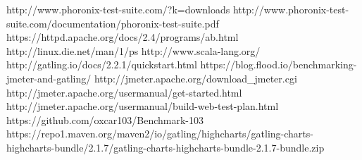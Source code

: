 \newpage

\begin{thebibliography}{xx}
	 http://www.phoronix-test-suite.com/?k=downloads
	 http://www.phoronix-test-suite.com/documentation/phoronix-test-suite.pdf
	 https://httpd.apache.org/docs/2.4/programs/ab.html
	 http://linux.die.net/man/1/ps
	 http://www.scala-lang.org/
	 http://gatling.io/docs/2.2.1/quickstart.html
	 https://blog.flood.io/benchmarking-jmeter-and-gatling/
	 http://jmeter.apache.org/download\_jmeter.cgi
	 http://jmeter.apache.org/usermanual/get-started.html
	 http://jmeter.apache.org/usermanual/build-web-test-plan.html
	 https://github.com/oxcar103/Benchmark-103
	https://repo1.maven.org/maven2/io/gatling/highcharts/gatling-charts-highcharts-bundle/2.1.7/gatling-charts-highcharts-bundle-2.1.7-bundle.zip
	
	
\end{thebibliography}

